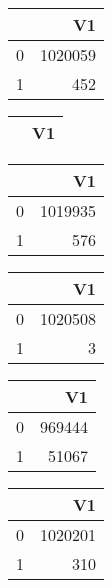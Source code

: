 \bigskip\bigskip
\centering
\begin{tabular}{rr}
  \hline
 & V1 \\ 
  \hline
0 & 1020059 \\ 
  1 & 452 \\ 
   \hline
\end{tabular}

\bigskip\bigskip
\centering
\begin{tabular}{rr}
  \hline
 & V1 \\ 
  \hline
\hline
\end{tabular}

\bigskip\bigskip
\centering
\begin{tabular}{rr}
  \hline
 & V1 \\ 
  \hline
0 & 1019935 \\ 
  1 & 576 \\ 
   \hline
\end{tabular}

\bigskip\bigskip
\centering
\begin{tabular}{rr}
  \hline
 & V1 \\ 
  \hline
0 & 1020508 \\ 
  1 &   3 \\ 
   \hline
\end{tabular}

\bigskip\bigskip
\centering
\begin{tabular}{rr}
  \hline
 & V1 \\ 
  \hline
0 & 969444 \\ 
  1 & 51067 \\ 
   \hline
\end{tabular}

\bigskip\bigskip
\centering
\begin{tabular}{rr}
  \hline
 & V1 \\ 
  \hline
0 & 1020201 \\ 
  1 & 310 \\ 
   \hline
\end{tabular}

